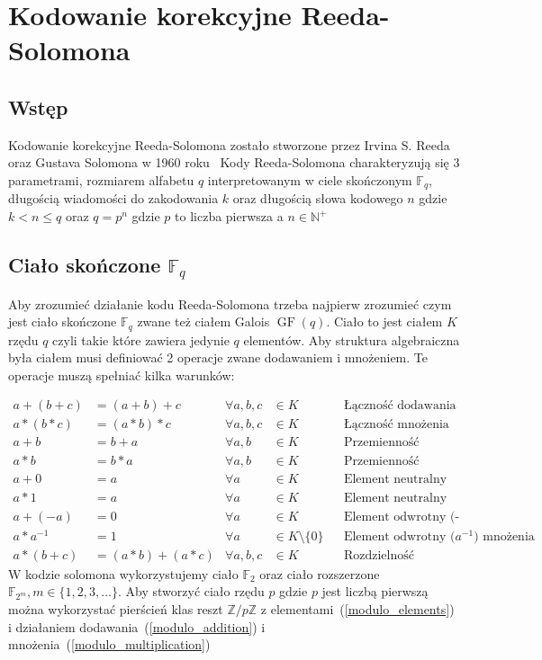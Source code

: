 \newcommand{\modulo}[1]{\mathbb{Z} / #1 \mathbb{Z}}
\section{Kodowanie korekcyjne Reeda-Solomona}
\subsection{Wstęp}

Kodowanie korekcyjne Reeda-Solomona zostało stworzone przez Irvina S. Reeda
oraz Gustava Solomona w 1960 roku~\cite[]{Reed-Solomon-original}
Kody Reeda-Solomona charakteryzują się 3 parametrami, rozmiarem alfabetu $q$
interpretowanym w ciele skończonym $\mathbb{F}_q$, długością wiadomości do
zakodowania $k$ oraz długością słowa kodowego $n$ gdzie $k < n \leq q$ oraz
$q=p^n$ gdzie $p$ to liczba pierwsza a $n \in \mathbb{N}^+$

\subsection{Ciało skończone $\mathbb{F}_{q}$}

Aby zrozumieć działanie kodu Reeda-Solomona trzeba najpierw zrozumieć czym jest
ciało skończone $\mathbb{F}_q$ zwane też ciałem Galois $\operatorname{GF}(q)$.
Ciało to jest ciałem $K$ rzędu $q$ czyli takie które zawiera jedynie $q$ elementów.
Aby struktura algebraiczna była ciałem musi definiować 2 operacje zwane
dodawaniem i mnożeniem.
Te operacje muszą spełniać kilka warunków:

{\small
    \begin{align}
        a + (b + c) &= (a + b) + c & \forall a,b,c &\in K && \text{Łączność dodawania} \\
        a*(b*c) &= (a*b)*c & \forall a,b,c &\in K && \text{Łączność mnożenia} \\
        a + b &= b + a & \forall a,b &\in K && \text{Przemienność dodawania} \\
        a * b &= b * a & \forall a,b &\in K && \text{Przemienność mnożenia} \\
        a + 0 &= a & \forall a &\in K && \text{Element neutralny (0) dodawania} \\
        a * 1 &= a & \forall a &\in K && \text{Element neutralny (1) mnożenia} \\
        a + (-a) &= 0 & \forall a &\in K && \text{Element odwrotny (-a) dodawania} \\
        a*a^{-1} &= 1 & \forall a &\in K \setminus \{ 0 \} &&
            \text{Element odwrotny (} a^{-1} \text{) mnożenia} \label{field_mul_inverse}\\
        a*(b + c) &= (a*b) + (a*c) & \forall a,b,c &\in K &&
            \text{Rozdzielność mnożenia względem dodawania}
    \end{align}
}%
W kodzie solomona wykorzystujemy ciało $\mathbb{F}_2$ oraz ciało rozszerzone
$\mathbb{F}_{2^m}, m \in \{ 1, 2, 3, \ldots \}$.
Aby stworzyć ciało rzędu $p$ gdzie $p$ jest liczbą pierwszą można wykorzystać
pierścień klas reszt $\mathbb{Z} / p \mathbb{Z}$ z elementami~(\ref{modulo_elements})
i działaniem dodawania~(\ref{modulo_addition}) i mnożenia~(\ref{modulo_multiplication})

